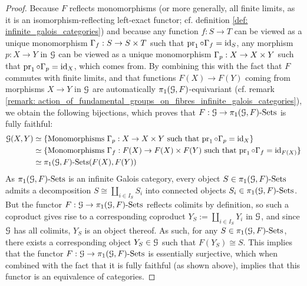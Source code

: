                     \begin{proof}
                        Because $F$ reflects monomorphisms (or more generally, all finite limits, as it is an isomorphism-reflecting left-exact functor; cf. definition \ref{def: infinite_galois_categories}) and because any function $f: S \to T$ can be viewed as a unique monomorphism $\Gamma_f: S \to S \x T$ such that $\operatorname{pr}_1 \circ \Gamma_f = \mathrm{id}_S$, any morphism $p: X \to Y$ in $\mathcal{G}$ can be viewed as a unique monomorphism $\Gamma_p: X \to X \x Y$ such that $\operatorname{pr}_1 \circ \Gamma_p = \mathrm{id}_X$, which comes from. By combining this with the fact that $F$ commutes with finite limits, and that functions $F(X) \to F(Y)$ coming from morphisms $X \to Y$ in $\mathcal{G}$ are automatically $\pi_1(\mathcal{G}, F)$-equivariant (cf. remark \ref{remark: action_of_fundamental_groups_on_fibres_infinite_galois_categories}), we obtain the following bijections, which proves that $F: \mathcal{G} \to \pi_1(\mathcal{G}, F)\text{-}\mathrm{Sets}$ is fully faithful:
                            $$
                                \begin{aligned}
                                    \calG(X, Y) & \cong \{\text{Monomorphisms $\Gamma_p: X \to X \x Y$ such that $\pr_1 \circ \Gamma_p = \id_X$}\}
                                    \\
                                    & \cong \{\text{Monomorphisms $\Gamma_f: F(X) \to F(X) \x F(Y)$ such that $\pr_1 \circ \Gamma_f = \id_{F(X)}$}\} 
                                    \\
                                    & \cong \pi_1(\calG, F)\-\Sets(F(X), F(Y))
                                \end{aligned}
                            $$
                        As $\pi_1(\mathcal{G}, F)\text{-}\mathrm{Sets}$ is an infinite Galois category, every object $S \in \pi_1(\mathcal{G}, F)\text{-}\mathrm{Sets}$ admits a decomposition $S \cong \coprod_{i \in I_S} S_i$ into connected objects $S_i \in \pi_1(\mathcal{G}, F)\text{-}\mathrm{Sets}$. But the functor $F: \mathcal{G} \to \pi_1(\mathcal{G}, F)\text{-}\mathrm{Sets}$ reflects colimits by definition, so such a coproduct gives rise to a corresponding coproduct $Y_S := \coprod_{i \in I_S} Y_i$ in $\mathcal{G}$, and since $\mathcal{G}$ has all colimits, $Y_S$ is an object thereof. As such, for any $S \in \pi_1(\mathcal{G}, F)\text{-}\mathrm{Sets}$, there exists a corresponding object $Y_S \in \mathcal{G}$ such that $F(Y_S) \cong S$. This implies that the functor $F: \mathcal{G} \to \pi_1(\mathcal{G}, F)\text{-}\mathrm{Sets}$ is essentially surjective, which when combined with the fact that it is fully faithful (as shown above), implies that this functor is an equivalence of categories. 
                        

\end{proof}
